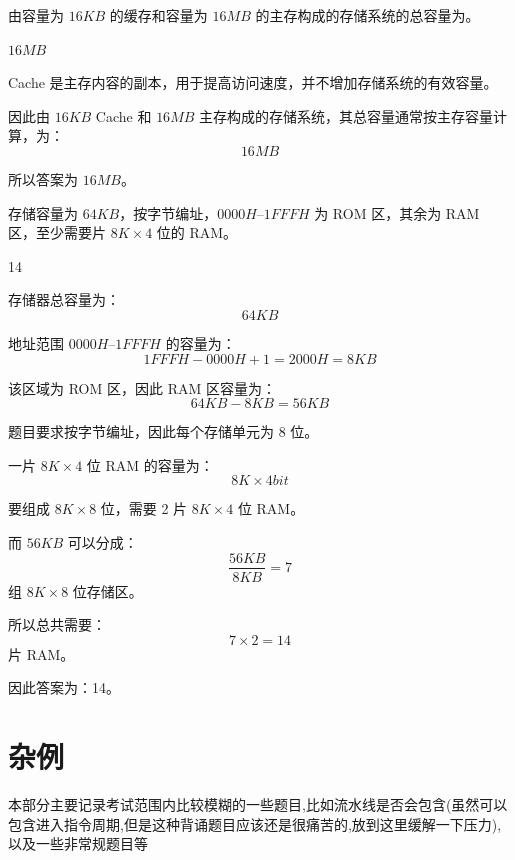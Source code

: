 \begin{question}
由容量为 $16KB$ 的缓存和容量为 $16MB$ 的主存构成的存储系统的总容量为\underline{\hspace{3cm}}。
\end{question}

\begin{answer}
$16MB$
\end{answer}

\begin{analysisenv}
Cache 是主存内容的副本，用于提高访问速度，并不增加存储系统的有效容量。

因此由 $16KB$ Cache 和 $16MB$ 主存构成的存储系统，其总容量通常按主存容量计算，为：
\[
16MB
\]

所以答案为 $16MB$。
\end{analysisenv}



\begin{question}
存储容量为 $64KB$，按字节编址，$0000H$--$1FFFH$ 为 ROM 区，其余为 RAM 区，至少需要\underline{\hspace{3cm}}片 $8K \times 4$ 位的 RAM。
\end{question}

\begin{answer}
14
\end{answer}

\begin{analysisenv}
存储器总容量为：
\[
64KB
\]

地址范围 $0000H$--$1FFFH$ 的容量为：
\[
1FFFH-0000H+1=2000H=8KB
\]

该区域为 ROM 区，因此 RAM 区容量为：
\[
64KB-8KB=56KB
\]

题目要求按字节编址，因此每个存储单元为 $8$ 位。

一片 $8K \times 4$ 位 RAM 的容量为：
\[
8K \times 4bit
\]

要组成 $8K \times 8$ 位，需要 2 片 $8K \times 4$ 位 RAM。

而 $56KB$ 可以分成：
\[
\frac{56KB}{8KB}=7
\]
组 $8K \times 8$ 位存储区。

所以总共需要：
\[
7 \times 2 = 14
\]
片 RAM。

因此答案为：14。
\end{analysisenv}







\section{杂例}
    本部分主要记录考试范围内比较模糊的一些题目,比如流水线是否会包含(虽然可以包含进入指令周期,但是这种背诵题目应该还是很痛苦的,放到这里缓解一下压力),以及一些非常规题目等

